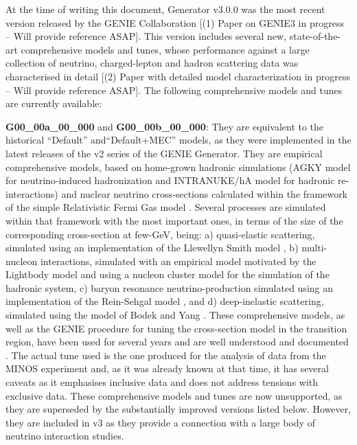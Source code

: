 At the time of writing this document, Generator v3.0.0 was the most recent version released by the GENIE Collaboration [(1) Paper on GENIE3 in progress -- Will provide reference ASAP]. This version includes several new, state-of-the-art comprehensive models and tunes, whose performance against a large collection of neutrino, charged-lepton and hadron scattering data was characterised in detail [(2) Paper with detailed model characterization in progress -- Will provide reference ASAP]. The following comprehensive models and tunes are currently available:

{\bf G00\_00a\_00\_000} and {\bf G00\_00b\_00\_000}: They are equivalent to the historical ``Default'' and``Default+MEC'' models, as they were implemented in the latest releases of the v2 series of the GENIE Generator. They are empirical comprehensive models, based on home-grown hadronic simulations (AGKY model \cite{Yang:2009zx} for neutrino-induced hadronization and INTRANUKE/hA model \cite{Dytman:2015taa} for hadronic re-interactions) and nuclear neutrino cross-sections calculated within the framework of the simple Relativistic Fermi Gas model \cite{Bodek:1981wr}. Several processes are simulated within that framework with the most important ones, in terms of the size of the corresponding cross-section at few-GeV, being: a) quasi-elastic scattering, simulated using an implementation of the Llewellyn Smith model \cite{LlewellynSmith:1971uhs}, b) multi-nucleon interactions, simulated with an empirical model motivated by the Lightbody model \cite{Lightbody:1988gcu} and using a nucleon cluster model for the simulation of the hadronic system, c) baryon resonance neutrino-production simulated using an implementation of the Rein-Sehgal model \cite{Rein:1980wg}, and d) deep-inelastic scattering, simulated using the model of Bodek and Yang \cite{Bodek:2002ps}.  These comprehensive models, as well as the GENIE procedure for tuning the cross-section model in the transition region, have been used for several years and are well understood and documented \cite{Andreopoulos:2009rq}. The actual tune used is the one produced for the analysis of data from the MINOS experiment and, as it was already known at that time, it has several caveats as it emphasises inclusive data and does not address tensions with exclusive data. These comprehensive models and tunes are now unsupported, as they are superseded by the substantially improved versions listed below. However, they are included in v3 as they provide a connection with a large body of neutrino interaction studies.

